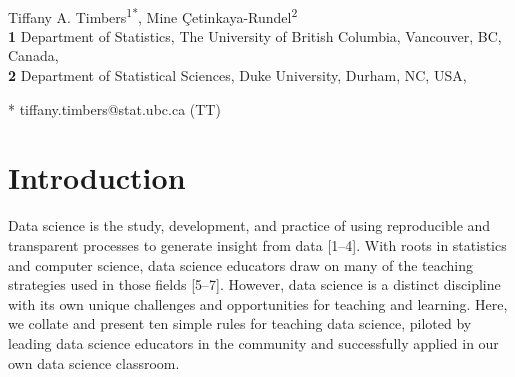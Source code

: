 \documentclass[
  10pt,
  letterpaper,
]{article}
\begin{document}
\vspace*{0.2in}

\begin{flushleft}
{\Large
\textbf{} %
}
\newline
\\
Tiffany A. Timbers\textsuperscript{1*}, Mine
Çetinkaya-Rundel\textsuperscript{2}
\\
\bigskip
\textbf{1} Department of Statistics, The University of British Columbia,
Vancouver, BC, Canada, \\ \textbf{2} Department of Statistical Sciences,
Duke University, Durham, NC, USA, 
\bigskip

% 
%
* tiffany.timbers@stat.ubc.ca (TT)

\end{flushleft}




\section{Introduction}\label{sec-intro}

Data science is the study, development, and practice of using
reproducible and transparent processes to generate insight from data
{[}1--4{]}. With roots in statistics and computer science, data science
educators draw on many of the teaching strategies used in those fields
{[}5--7{]}. However, data science is a distinct discipline with its own
unique challenges and opportunities for teaching and learning. Here, we
collate and present ten simple rules for teaching data science, piloted
by leading data science educators in the community and successfully
applied in our own data science classroom.
\end{document}
